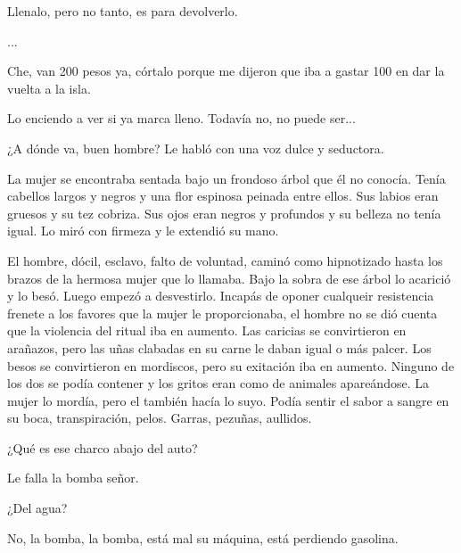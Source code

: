 \documentclass[11pt,twoside,openright,a6paper]{book}
\begin{document}
Llenalo, pero no tanto, es para devolverlo.

...

Che, van 200 pesos ya, córtalo porque me dijeron que iba a gastar 100 en
dar la vuelta a la isla.

Lo enciendo a ver si ya marca lleno. Todavía no,
no puede ser...


\vspace{0.5cm}
\hrulefill\hspace{0.2cm} \decofourleft\decofourright \hspace{0.2cm} \hrulefill
\vspace{0.5cm}

¿A dónde va, buen hombre? Le habló con una voz dulce y seductora.

La mujer se encontraba sentada bajo un frondoso árbol que él no
conocía. Tenía cabellos largos y negros y una flor espinosa peinada entre
ellos. Sus labios eran gruesos y su tez cobriza. Sus ojos eran negros y
profundos y su belleza no tenía igual. Lo miró con firmeza y le extendió
su mano.

El hombre, dócil, esclavo, falto de voluntad, caminó como hipnotizado hasta
los brazos de la hermosa mujer que lo llamaba. Bajo la sobra de ese árbol
lo acarició y lo besó. Luego empezó a desvestirlo. Incapás de oponer
cualqueir resistencia frenete a los favores que la mujer le proporcionaba,
el hombre no se dió cuenta que la violencia del ritual iba en aumento. Las
caricias se convirtieron en arañazos, pero las uñas clabadas en su carne
le daban igual o más palcer. Los besos se convirtieron en mordiscos, pero
su exitación iba en aumento. Ninguno de los dos se podía contener y
los gritos eran como de animales apareándose. La mujer lo mordía, pero
el también hacía lo suyo. Podía sentir el sabor a sangre en su boca,
transpiración, pelos. Garras, pezuñas, aullidos.


\vspace{0.5cm}
\hrulefill\hspace{0.2cm} \decofourleft\decofourright \hspace{0.2cm} \hrulefill
\vspace{0.5cm}

¿Qué es ese charco abajo del auto?

Le falla la bomba señor.

¿Del agua?

No, la bomba, la bomba, está mal su máquina, está perdiendo gasolina.


\vspace{0.5cm}
\hrulefill\hspace{0.2cm} \decofourleft\decofourright \hspace{0.2cm} \hrulefill
\vspace{0.5cm}
\end{document}
